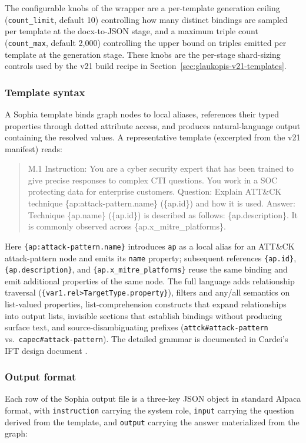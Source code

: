 \documentclass[webpdf,contemporary,large]{oup-authoring-template}
\theoremstyle{thmstyleone}
\theoremstyle{thmstyletwo}
\theoremstyle{thmstylethree}
\begin{document}
The configurable knobs of the wrapper are a per-template generation ceiling (\texttt{count\_limit}, default 10) controlling how many distinct bindings are sampled per template at the docx-to-JSON stage, and a maximum triple count (\texttt{count\_max}, default 2{,}000) controlling the upper bound on triples emitted per template at the generation stage. These knobs are the per-stage shard-sizing controls used by the v21 build recipe in Section~\ref{sec:glaukopis-v21-templates}.

\subsubsection*{Template syntax}
A Sophia template binds graph nodes to local aliases, references their typed properties through dotted attribute access, and produces natural-language output containing the resolved values. A representative template (excerpted from the v21 manifest) reads:

\begin{quote}\small\ttfamily
M.1 Instruction: You are a cyber security expert that has been trained to give precise responses to complex CTI questions. You work in a SOC protecting data for enterprise customers. Question: Explain ATT\&CK technique \{ap:attack-pattern.name\} (\{ap.id\}) and how it is used. Answer: Technique \{ap.name\} (\{ap.id\}) is described as follows: \{ap.description\}. It is commonly observed across \{ap.x\_mitre\_platforms\}.
\end{quote}

Here \verb|{ap:attack-pattern.name}| introduces \texttt{ap} as a local alias for an ATT\&CK attack-pattern node and emits its \texttt{name} property; subsequent references \verb|{ap.id}|, \verb|{ap.description}|, and \verb|{ap.x_mitre_platforms}| reuse the same binding and emit additional properties of the same node. The full language adds relationship traversal (\verb|{var1.rel>TargetType.property}|), filters and any/all semantics on list-valued properties, list-comprehension constructs that expand relationships into output lists, invisible sections that establish bindings without producing surface text, and source-disambiguating prefixes (\verb|attck#attack-pattern| vs.\ \verb|capec#attack-pattern|). The detailed grammar is documented in Cardei's IFT design document \cite{cardei2025ift}.

\subsubsection*{Output format}
Each row of the Sophia output file is a three-key JSON object in standard Alpaca format, with \texttt{instruction} carrying the system role, \texttt{input} carrying the question derived from the template, and \texttt{output} carrying the answer materialized from the graph:
\end{document}

